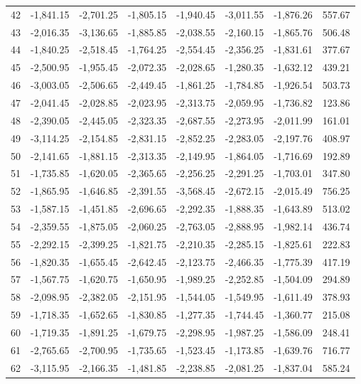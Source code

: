 \begin{longtable}{rrrrrrrr}
42 & -1,841.15 & -2,701.25 & -1,805.15 & -1,940.45 & -3,011.55 & -1,876.26 & 557.67  \\
43 & -2,016.35 & -3,136.65 & -1,885.85 & -2,038.55 & -2,160.15 & -1,865.76 & 506.48  \\
44 & -1,840.25 & -2,518.45 & -1,764.25 & -2,554.45 & -2,356.25 & -1,831.61 & 377.67  \\
45 & -2,500.95 & -1,955.45 & -2,072.35 & -2,028.65 & -1,280.35 & -1,632.12 & 439.21  \\
46 & -3,003.05 & -2,506.65 & -2,449.45 & -1,861.25 & -1,784.85 & -1,926.54 & 503.73  \\
47 & -2,041.45 & -2,028.85 & -2,023.95 & -2,313.75 & -2,059.95 & -1,736.82 & 123.86  \\
48 & -2,390.05 & -2,445.05 & -2,323.35 & -2,687.55 & -2,273.95 & -2,011.99 & 161.01  \\
49 & -3,114.25 & -2,154.85 & -2,831.15 & -2,852.25 & -2,283.05 & -2,197.76 & 408.97  \\
50 & -2,141.65 & -1,881.15 & -2,313.35 & -2,149.95 & -1,864.05 & -1,716.69 & 192.89  \\
51 & -1,735.85 & -1,620.05 & -2,365.65 & -2,256.25 & -2,291.25 & -1,703.01 & 347.80  \\
52 & -1,865.95 & -1,646.85 & -2,391.55 & -3,568.45 & -2,672.15 & -2,015.49 & 756.25  \\
53 & -1,587.15 & -1,451.85 & -2,696.65 & -2,292.35 & -1,888.35 & -1,643.89 & 513.02  \\
54 & -2,359.55 & -1,875.05 & -2,060.25 & -2,763.05 & -2,888.95 & -1,982.14 & 436.74  \\
55 & -2,292.15 & -2,399.25 & -1,821.75 & -2,210.35 & -2,285.15 & -1,825.61 & 222.83  \\
56 & -1,820.35 & -1,655.45 & -2,642.45 & -2,123.75 & -2,466.35 & -1,775.39 & 417.19  \\
57 & -1,567.75 & -1,620.75 & -1,650.95 & -1,989.25 & -2,252.85 & -1,504.09 & 294.89  \\
58 & -2,098.95 & -2,382.05 & -2,151.95 & -1,544.05 & -1,549.95 & -1,611.49 & 378.93  \\
59 & -1,718.35 & -1,652.65 & -1,830.85 & -1,277.35 & -1,744.45 & -1,360.77 & 215.08  \\
60 & -1,719.35 & -1,891.25 & -1,679.75 & -2,298.95 & -1,987.25 & -1,586.09 & 248.41  \\
61 & -2,765.65 & -2,700.95 & -1,735.65 & -1,523.45 & -1,173.85 & -1,639.76 & 716.77  \\
62 & -3,115.95 & -2,166.35 & -1,481.85 & -2,238.85 & -2,081.25 & -1,837.04 & 585.24  \\

\end{longtable}
